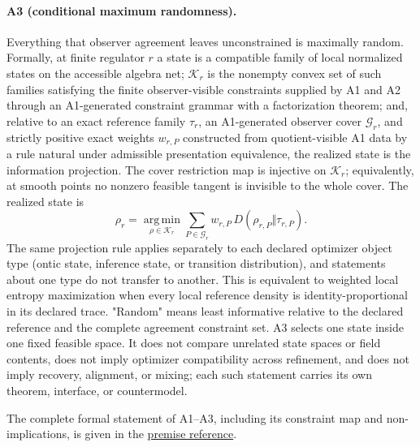 \paragraph{A3 (conditional maximum randomness).}
Everything that observer agreement leaves unconstrained is maximally random.
Formally, at finite regulator \(r\) a state is a compatible family of local
normalized states on the accessible algebra net; \(\mathcal K_r\) is the
nonempty convex set of such families satisfying the finite observer-visible
constraints supplied by A1 and A2 through an A1-generated constraint
grammar with a factorization theorem; and, relative to an exact reference
family \(\tau_r\), an A1-generated observer cover \(\mathcal G_r\), and
strictly positive exact weights \(w_{r,P}\) constructed from quotient-visible
A1 data by a rule natural under admissible presentation equivalence, the
realized state is the
information projection. The cover restriction map is injective on
\(\mathcal K_r\); equivalently, at smooth points no nonzero feasible
tangent is invisible to the whole cover. The realized state is
\[
\rho_r=\operatorname*{arg\,min}_{\rho\in\mathcal K_r}
\sum_{P\in\mathcal G_r} w_{r,P}\,D(\rho_{r,P}\Vert\tau_{r,P}).
\]
The same projection rule applies separately to each declared optimizer
object type (ontic state, inference state, or transition distribution), and
statements about one type do not transfer to another.
This is equivalent to weighted local entropy maximization when every local
reference density is identity-proportional in its declared trace. "Random"
means least informative relative to the
declared reference and the complete agreement constraint set. A3
selects one state inside one fixed feasible space. It does not compare
unrelated state spaces or field contents, does not imply optimizer
compatibility across refinement, and does not imply recovery, alignment, or
mixing; each such statement carries its own theorem, interface, or
countermodel.

The complete formal statement of A1--A3, including its constraint map and
non-implications, is given in the
\href{https://github.com/FloatingPragma/observer-patch-holography/blob/r2052/docs/AXIOM_REFERENCE.md}
{premise reference}.
